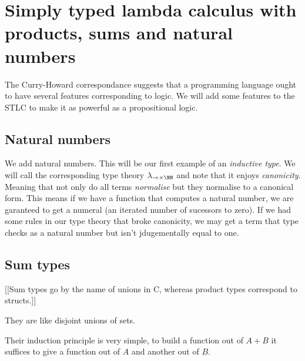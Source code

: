 \section{Simply typed lambda calculus with products, sums and natural numbers}

The Curry-Howard correspondance suggests that a programming language ought to have several features corresponding to logic. We will add some features to the STLC to make it as powerful as a propositional logic.

\subsection{Natural numbers}

We add natural numbers. This will be our first example of an \emph{inductive type}. We will call the corresponding type theory $\lambda_{\to \times \NN}$ and note that it enjoys \emph{canonicity}. Meaning that not only do all terms \emph{normalise} but they normalise to a canonical form. This means if we have a function that computes a natural number, we are garanteed to get a numeral (an iterated number of sucessors to zero). If we had some rules in our type theory that broke canonicity, we may get a term that type checks as a natural number but isn't jdugementally equal to one.

\subsection{Sum types}

[[Sum types go by the name of unions in C, whereas product types correspond to structs.]]

They are like disjoint unions of sets.

Their induction principle is very simple, to build a function out of $A + B$ it suffices to give a function out of $A$ and another out of $B$.


